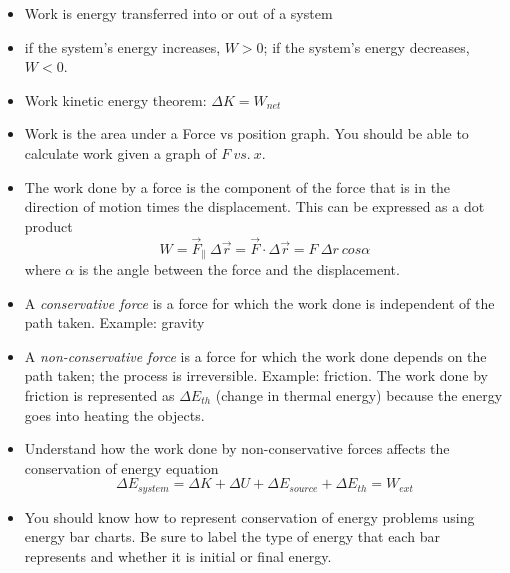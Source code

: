 \begin{itemize}
\item Work is energy transferred into or out of a system
\item if the system's energy increases, $W >0$; if the system's energy decreases, $W < 0$.
\item Work kinetic energy theorem: $\Delta K = W_{net}$
\item Work is the area under a Force vs position graph.  You should be
  able to calculate work given a graph of $F \ vs. \ x$.
\item The work done by a force is the component of the force that is in the direction of motion times the displacement.  This can be expressed as a dot product
$$ W = \vec{F}_{\parallel}~ \Delta \vec{r} = \vec{F} \cdot \Delta \vec{r} = F~\Delta r~ cos \alpha $$  where $\alpha$ is the angle between the force and the displacement.
\item A {\em conservative force} is a force for which the work done is independent of the path taken.  Example: gravity
\item A {\em non-conservative force} is a force for which the work done depends on the path taken; the process is irreversible.  Example: friction.  The work done by friction is represented as $\Delta E_{th}$ (change in thermal energy) because the energy goes into heating the objects.
\item Understand how the work done by non-conservative forces affects the conservation of energy equation
$$ \Delta E_{system} = \Delta K + \Delta U + \Delta E_{source} + \Delta E_{th}  = W_{ext}$$
\item You should know how to represent conservation of energy problems using energy bar charts.  Be sure to label the type of energy that each bar represents and whether it is initial or final energy.
\end{itemize}




\vspace*{-.15in}
